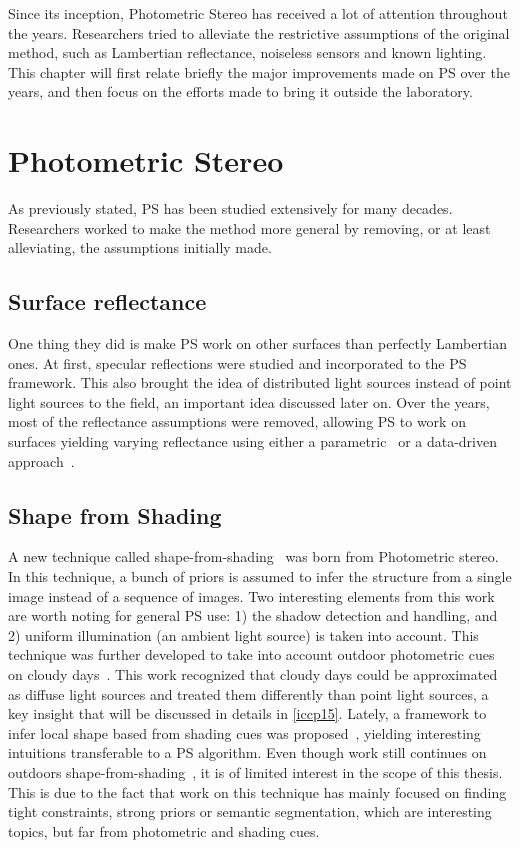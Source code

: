 \documentclass{report}
\begin{document}
Since its inception, Photometric Stereo has received a lot of attention throughout the years. Researchers tried to alleviate the restrictive assumptions of the original method, such as Lambertian reflectance, noiseless sensors and known lighting. This chapter will first relate briefly the major improvements made on PS over the years, and then focus on the efforts made to bring it outside the laboratory.


\section{Photometric Stereo}

As previously stated, PS has been studied extensively for many decades. Researchers worked to make the method more general by removing, or at least alleviating, the assumptions initially made.

\subsection{Surface reflectance}
One thing they did is make PS work on other surfaces than perfectly Lambertian ones. At first, specular reflections \cite{Ikeuchi1981} were studied and incorporated to the PS framework. This also brought the idea of distributed light sources instead of point light sources to the field, an important idea discussed later on. Over the years, most of the reflectance assumptions were removed, allowing PS to work on surfaces yielding varying reflectance using either a parametric~\cite{hertzmann-pami-05,goldman-tpami-10} or a data-driven approach~\cite{alldrin-cvpr-08}.

\subsection{Shape from Shading}
A new technique called shape-from-shading~\cite{Horn1989} was born from Photometric stereo. In this technique, a bunch of priors is assumed to infer the structure from a single image instead of a sequence of images. Two interesting elements from this work are worth noting for general PS use: 1) the shadow detection and handling, and 2) uniform illumination (an ambient light source) is taken into account. This technique was further developed to take into account outdoor photometric cues on cloudy days~\cite{Langer1994}. This work recognized that cloudy days could be approximated as diffuse light sources and treated them differently than point light sources, a key insight that will be discussed in details in \ref{iccp15}. Lately, a framework to infer local shape based from shading cues was proposed~\cite{Xiong2013}, yielding interesting intuitions transferable to a PS algorithm. Even though work still continues on outdoors shape-from-shading~\cite{oxholm-eccv-12,johnson-cvpr-11,barron-pami-15}, it is of limited interest in the scope of this thesis. This is due to the fact that work on this technique has mainly focused on finding tight constraints, strong priors or semantic segmentation, which are interesting topics, but far from photometric and shading cues.
\end{document}
